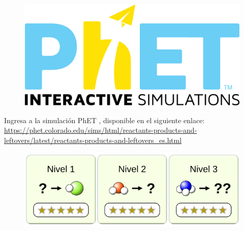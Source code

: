 \begin{opening}
    {
    \vspace{-0.7cm}
    \begin{figure}[H]
        \centering
        \includegraphics[width=.12\linewidth]{../images/phet}
    \end{figure}
    Ingresa a la simulación PhET , disponible en el siguiente enlace: \\
    {
    \scriptsize
    \url{https://phet.colorado.edu/sims/html/reactants-products-and-leftovers/latest/reactants-products-and-leftovers_es.html}
    }
    \begin{center}






        \begin{figure}[H]
            \centering
            \includegraphics[width=0.8\linewidth]{../images/20230415122320}
        \end{figure}

    \end{center}
    }
\end{opening}